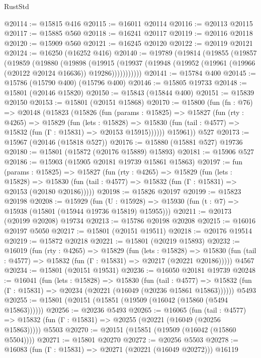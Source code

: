 \begin{lexlean}{RustStd}
\begin{coremodule}
@20114 := @15815 @416
@20115 := @16011 @20114
@20116 := @20113 @20115
@20117 := @15885 @560
@20118 := @16241 @20117
@20119 := @20116 @20118
@20120 := @15909 @560
@20121 := @16245 @20120
@20122 := @20119 @20121
@20124 := @16250 (@16252 @416)
@20140 := @19789
    (@19814
      (@19855
        (@19857
          (@19859
            (@19880
              (@19898
                (@19915
                  (@19937 (@19948 (@19952 (@19961 (@19966 (@20122 @20124 @16636)) @19286)))))))))))
@20141 := @15784 @400
@20145 := @15786 (@15790 @400) (@15796 @400)
@20146 := @15805 @19733
@20148 := @15801 (@20146 @15820)
@20150 := @15843 (@15844 @400)
@20151 := @15839 @20150
@20153 := @15801 (@20151 @15868)
@20170 := @15800
    (fun (fn : @76) =>
    @20148
      (@15823
        (@15826
          (fun (params : @15825) =>
          @15827
            (fun (rty : @4265) =>
            @15829
              (fun (lets : @15828) =>
              @15830 (fun (tail : @4577) => @15832 (fun (Γ : @15831) => @20153 @15915))))))
        @15961))
    @527
@20173 := @15967 (@20146 (@15818 @527))
@20176 := @15880 (@15881 @527) @19736
@20180 := @15801 (@15872 (@20176 @15889) @15893)
@20181 := @15906 @527
@20186 := @15903 (@15905 @20181 @19739 @15861 @15863)
@20197 := fun (params : @15825) =>
  @15827
    (fun (rty : @4265) =>
    @15829
      (fun (lets : @15828) =>
      @15830 (fun (tail : @4577) => @15832 (fun (Γ : @15831) => @20153 (@20180 @20186)))))
@20198 := @15826 @20197
@20199 := @15823 @20198
@20208 := @15929
    (fun (U : @15928) => @15930 (fun (t : @7) => @15938 (@15801 (@15944 @19736 @15819) @15955)))
@20211 := @20173 (@20199 @20208) @19734
@20213 := @15786 @20198 @20208
@20215 := @16016 @20197 @5050
@20217 := @15801 (@20151 @19511)
@20218 := @20176 @19514
@20219 := @15872 @20218
@20221 := @15801 (@20219 @15893)
@20232 := @16019
    (fun (rty : @4265) =>
    @15829
      (fun (lets : @15828) =>
      @15830 (fun (tail : @4577) => @15832 (fun (Γ : @15831) => @20217 (@20221 @20186)))))
    @4567
@20234 := @15801 (@20151 @19531)
@20236 := @16050 @20181 @19739
@20248 := @16041
    (fun (lets : @15828) =>
    @15830
      (fun (tail : @4577) =>
      @15832 (fun (Γ : @15831) => @20234 (@20221 (@16049 (@20236 @15861 @15863))))))
    @5493
@20255 := @15801 (@20151 (@15851 (@19509 (@16042 (@15860 (@5494 @15863))))))
@20256 := @20236 @5493
@20265 := @16065
    (fun (tail : @4577) => @15832 (fun (Γ : @15831) => @20255 (@20221 (@16049 (@20256 @15863)))))
    @5503
@20270 := @20151 (@15851 (@19509 (@16042 (@15860 @5504))))
@20271 := @15801 @20270
@20272 := @20256 @5503
@20278 := @16083 (fun (Γ : @15831) => @20271 (@20221 (@16049 @20272))) @16119

\end{coremodule}
\end{lexlean}
